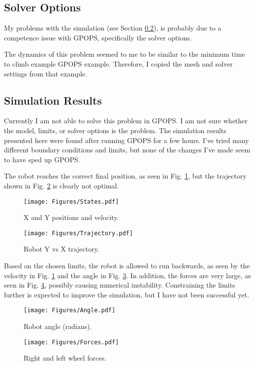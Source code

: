 \documentclass[12pt]{article}
\numberwithin{equation}{section} %
\numberwithin{figure}{section} %
\begin{document}
\subsection{Solver Options}

My problems with the simulation (see Section \ref{sec:SimResults}), is probably due to a competence issue with GPOPS, specifically the solver options.

The dynamics of this problem seemed to me to be similar to the minimum time to climb example GPOPS example. Therefore, I copied the mesh and solver settings from that example.

\subsection{Simulation Results}
\label{sec:SimResults}

Currently I am not able to solve this problem in GPOPS. I am not sure whether the model, limits, or solver options is the problem. The simulation results presented here were found after running GPOPS for a few hours. I've tried many different boundary conditions and limits, but none of the changes I've made seem to have sped up GPOPS.

The robot reaches the correct final position, as seen in Fig. \ref{fig:States}, but the trajectory shown in Fig. \ref{fig:Trajectory} is clearly not optimal.

\begin{figure}[h!]
	\texttt{[image: Figures/States.pdf]}
	\centering
	\caption{X and Y positions and velocity.}
	\label{fig:States}
\end{figure}

\begin{figure}[h!]
	\texttt{[image: Figures/Trajectory.pdf]}
	\centering
	\caption{Robot Y vs X trajectory.}
	\label{fig:Trajectory}
\end{figure}

Based on the chosen limits, the robot is allowed to run backwards, as seen by the velocity in Fig. \ref{fig:States} and the angle in Fig. \ref{fig:Angle}. In addition, the forces are very large, as seen in Fig. \ref{fig:Forces}, possibly causing numerical instability. Constraining the limits further is expected to improve the simulation, but I have not been successful yet.

\begin{figure}[h!]
	\texttt{[image: Figures/Angle.pdf]}
	\centering
	\caption{Robot angle (radians).}
	\label{fig:Angle}
\end{figure}

\begin{figure}[h!]
	\texttt{[image: Figures/Forces.pdf]}
	\centering
	\caption{Right and left wheel forces.}
	\label{fig:Forces}
\end{figure}

%
%
	
\end{document}
